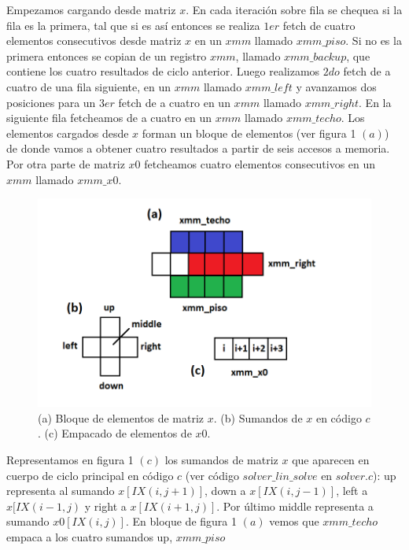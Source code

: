 \par Empezamos cargando desde matriz $x$.
 En cada iteración sobre fila se chequea si la fila es la primera, tal que si es así entonces 
 se realiza $1er$ fetch de cuatro elementos consecutivos desde matriz $x$ en un $xmm$ llamado $xmm\_piso$. Si no es la primera entonces se copian de un registro $xmm$, llamado $xmm\_backup$, que contiene los 
 cuatro resultados de ciclo anterior.
 Luego realizamos $2do$ fetch de a cuatro de una fila siguiente, en un $xmm$ llamado
 $xmm\_left$ y avanzamos dos posiciones para un $3er$ fetch de a cuatro en un $xmm$ llamado $xmm\_right$.
 En la siguiente fila fetcheamos de a cuatro en un $xmm$ llamado $xmm\_techo$. Los elementos cargados desde $x$ forman un bloque de elementos (ver figura 1 $(a)$) de donde vamos a obtener cuatro resultados a partir de seis accesos a memoria.
 Por otra parte de matriz $x0$ fetcheamos cuatro elementos consecutivos en un $xmm$ llamado $xmm\_x0$.\newline
\begin{figure}[h]

\centering
\includegraphics[scale=0.6] {celdas_xmm}
  
 \caption{(a) Bloque de elementos de matriz $x$. (b) Sumandos de $x$ en código $c$. (c) Empacado de elementos de $x0$.}
\end{figure} 
\par Representamos en figura 1 $(c)$ los sumandos de matriz $x$ que aparecen en cuerpo de ciclo principal 
 en código $c$ (ver código $solver\_lin\_solve$ en $solver.c$):
 up representa al sumando $x[IX(i,j+1)]$, down a $x[IX(i,j-1)]$, left a $x[IX(i-1,j)$ y right a 
 $x[IX(i+1,j)]$. Por último middle representa a sumando $x0[IX(i,j)]$. En bloque de figura 1 $(a)$ vemos que $xmm\_techo$ empaca a los cuatro sumandos up, $xmm\_piso$

